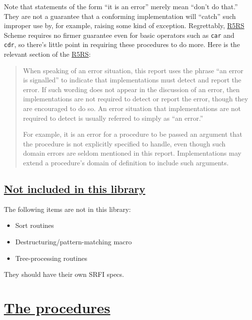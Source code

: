 Note that statements of the form ``it is an error'' merely mean ``don't
do that.'' They are not a guarantee that a conforming implementation
will ``catch'' such improper use by, for example, raising some kind of
exception. Regrettably, \protect\hyperlink{R5RS}{R5RS} Scheme requires
no firmer guarantee even for basic operators such as \texttt{car} and
\texttt{cdr}, so there's little point in requiring these procedures to
do more. Here is the relevant section of the
\protect\hyperlink{R5RS}{R5RS}:

\begin{quote}
When speaking of an error situation, this report uses the phrase ``an
error is signalled'' to indicate that implementations must detect and
report the error. If such wording does not appear in the discussion of
an error, then implementations are not required to detect or report the
error, though they are encouraged to do so. An error situation that
implementations are not required to detect is usually referred to simply
as ``an error.''

For example, it is an error for a procedure to be passed an argument
that the procedure is not explicitly specified to handle, even though
such domain errors are seldom mentioned in this report. Implementations
may extend a procedure's domain of definition to include such arguments.
\end{quote}

\subsection{\texorpdfstring{\href{}{Not included in this
library}}{Not included in this library}}\label{not-included-in-this-library}

The following items are not in this library:

\begin{itemize}
\tightlist
\item
  Sort routines
\item
  Destructuring/pattern-matching macro
\item
  Tree-processing routines
\end{itemize}

They should have their own SRFI specs.

\section{\texorpdfstring{\href{}{The
procedures}}{The procedures}}\label{the-procedures}

